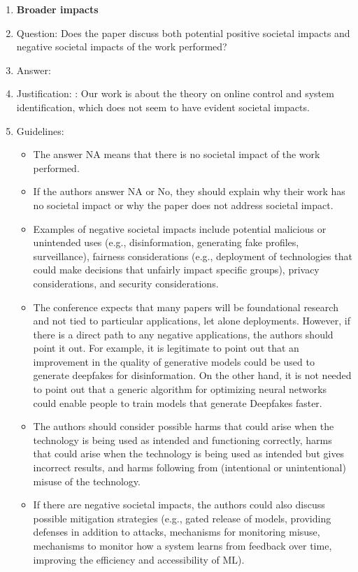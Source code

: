 \documentclass{article}
\theoremstyle{definition}
\begin{document}
\begin{enumerate}
\item {\bf Broader impacts}
    \item[] Question: Does the paper discuss both potential positive societal impacts and negative societal impacts of the work performed?
    \item[] Answer: \answerNA{} %
    \item[] Justification: : Our work is about the theory on online control and system identification, which does not seem to have
evident societal impacts.
    \item[] Guidelines:
    \begin{itemize}
        \item The answer NA means that there is no societal impact of the work performed.
        \item If the authors answer NA or No, they should explain why their work has no societal impact or why the paper does not address societal impact.
        \item Examples of negative societal impacts include potential malicious or unintended uses (e.g., disinformation, generating fake profiles, surveillance), fairness considerations (e.g., deployment of technologies that could make decisions that unfairly impact specific groups), privacy considerations, and security considerations.
        \item The conference expects that many papers will be foundational research and not tied to particular applications, let alone deployments. However, if there is a direct path to any negative applications, the authors should point it out. For example, it is legitimate to point out that an improvement in the quality of generative models could be used to generate deepfakes for disinformation. On the other hand, it is not needed to point out that a generic algorithm for optimizing neural networks could enable people to train models that generate Deepfakes faster.
        \item The authors should consider possible harms that could arise when the technology is being used as intended and functioning correctly, harms that could arise when the technology is being used as intended but gives incorrect results, and harms following from (intentional or unintentional) misuse of the technology.
        \item If there are negative societal impacts, the authors could also discuss possible mitigation strategies (e.g., gated release of models, providing defenses in addition to attacks, mechanisms for monitoring misuse, mechanisms to monitor how a system learns from feedback over time, improving the efficiency and accessibility of ML).
    \end{itemize}
    

\end{enumerate}
\end{document}
